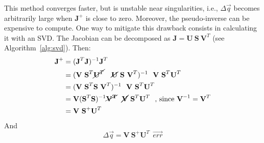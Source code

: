 \begin{enumerate}[itemsep=0em, topsep=0em, leftmargin=*]
    This method converges faster, but is unstable near singularities, i.e., $\Delta \overrightarrow{q}$ becomes arbitrarily large when $\textbf{J}^+$ is close to zero. Moreover, the pseudo-inverse can be expensive to compute. One way to mitigate this drawback consists in calculating it with an SVD. The Jacobian can be decomposed as $\textbf{J} = \textbf{U} \ \textbf{S} \ \textbf{V}^T$ (see Algorithm~\ref{alg:svd}). Then:
    \begin{equation}
          \begin{aligned}
          \textbf{J}^+
          & = (\textbf{J}^T \textbf{J})^{-1} \textbf{J}^T \\
          & = (\textbf{V} \ \textbf{S}^T \cancel{\textbf{U}^T} \ \ \
          \cancel{\textbf{U}} \ \textbf{S} \ \textbf{V}^T)^{-1} \ \  
          \textbf{V} \ \textbf{S}^T \textbf{U}^T \ \ \\
          & = (\textbf{V} \ \textbf{S}^T\textbf{S}\ \textbf{V}^T)^{-1} \ \  
          \textbf{V} \ \textbf{S}^T \textbf{U}^T \ \ \\
          & = \textbf{V} (\textbf{S}^T\textbf{S})^{-1} \cancel{\mathbf{V^T}} \ \  
          \cancel{\textbf{V}} \ \textbf{S}^T \textbf{U}^T \ \ \text{, since }\textbf{V}^{-1}=\textbf{V}^T\\
          & = \textbf{V} \ \textbf{S}^{+} \textbf{U}^T \ \ \\
        \end{aligned}
      \end{equation}
      And 
      \begin{equation}
        \Delta \overrightarrow{q} =  \textbf{V} \ \textbf{S}^{+} \textbf{U}^T \ \ \overrightarrow{err} 
      \end{equation}


\end{enumerate}
